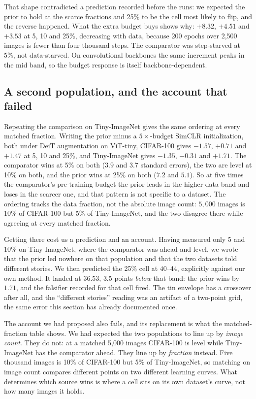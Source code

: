 That shape contradicted a prediction recorded before the runs: we expected the
prior to hold at the scarce fractions and 25\% to be the cell most likely to
flip, and the reverse happened. What the extra budget buys shows why: $+8.32$, $+4.51$ and $+3.53$ at 5, 10 and 25\%,
decreasing with data, because 200 epochs over 2{,}500 images is fewer than
four thousand steps. The comparator was step-starved at 5\%, not
data-starved. On convolutional backbones the same increment peaks in the mid
band, so the budget response is itself backbone-dependent.

\subsection{A second population, and the account that
failed}\label{sec:budget:tin}
Repeating the comparison on Tiny-ImageNet gives the same ordering at every
matched fraction. Writing the prior minus a $5\times$-budget SimCLR
initialization, both under DeiT augmentation on ViT-tiny, CIFAR-100 gives
$-1.57$, $+0.71$ and $+1.47$ at 5, 10 and 25\%, and Tiny-ImageNet gives
$-1.35$, $-0.31$ and $+1.71$. The comparator wins at 5\% on both ($3.9$ and
$3.7$ standard errors), the two are level at 10\% on both, and the prior wins
at 25\% on both ($7.2$ and $5.1$). So at five times the comparator's
pre-training budget the prior leads in the higher-data band and loses in the
scarcer one, and that pattern is not specific to a dataset. The ordering
tracks the data fraction, not the absolute image count: $5{,}000$
images is 10\% of CIFAR-100 but 5\% of Tiny-ImageNet, and the two disagree
there while agreeing at every matched fraction.

Getting there cost us a prediction and an account. Having
measured only 5 and 10\% on Tiny-ImageNet, where the
comparator was ahead and level, we wrote that the prior led nowhere on that
population and that the two datasets told different stories. We then
predicted the 25\% cell at $40$--$44$, explicitly against our own method.
It landed at $36.53$, $3.5$ points \emph{below} that band: the prior wins by
$1.71$, and the falsifier recorded for that cell fired. The tin
envelope has a crossover after all, and the ``different stories'' reading
was an artifact of a two-point grid, the same error this section has already
documented once.

The account we had proposed also fails, and its replacement is what the
matched-fraction table shows. We had expected the two populations to line up
by \emph{image count}. They do not: at a matched 5{,}000 images CIFAR-100 is
level while Tiny-ImageNet has the comparator ahead. They line up by
\emph{fraction} instead. Five thousand images is 10\% of CIFAR-100 but 5\%
of Tiny-ImageNet, so matching on image count compares different points on
two different learning curves. What determines which source wins is where a
cell sits on its own dataset's curve, not how many images it holds.

